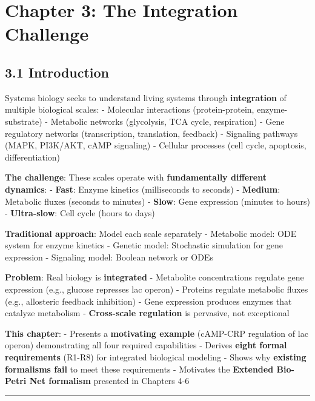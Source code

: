 \hypertarget{chapter-3-the-integration-challenge}{%
\chapter{Chapter 3: The Integration
Challenge}\label{chapter-3-the-integration-challenge}}

\hypertarget{introduction}{%
\section{3.1 Introduction}\label{introduction}}

Systems biology seeks to understand living systems through
\textbf{integration} of multiple biological scales: - Molecular
interactions (protein-protein, enzyme-substrate) - Metabolic networks
(glycolysis, TCA cycle, respiration) - Gene regulatory networks
(transcription, translation, feedback) - Signaling pathways (MAPK,
PI3K/AKT, cAMP signaling) - Cellular processes (cell cycle, apoptosis,
differentiation)

\textbf{The challenge}: These scales operate with \textbf{fundamentally
different dynamics}: - \textbf{Fast}: Enzyme kinetics (milliseconds to
seconds) - \textbf{Medium}: Metabolic fluxes (seconds to minutes) -
\textbf{Slow}: Gene expression (minutes to hours) - \textbf{Ultra-slow}:
Cell cycle (hours to days)

\textbf{Traditional approach}: Model each scale separately - Metabolic
model: ODE system for enzyme kinetics - Genetic model: Stochastic
simulation for gene expression - Signaling model: Boolean network or
ODEs

\textbf{Problem}: Real biology is \textbf{integrated} - Metabolite
concentrations regulate gene expression (e.g., glucose represses lac
operon) - Proteins regulate metabolic fluxes (e.g., allosteric feedback
inhibition) - Gene expression produces enzymes that catalyze metabolism
- \textbf{Cross-scale regulation} is pervasive, not exceptional

\textbf{This chapter}: - Presents a \textbf{motivating example}
(cAMP-CRP regulation of lac operon) demonstrating all four required
capabilities - Derives \textbf{eight formal requirements} (R1-R8) for
integrated biological modeling - Shows why \textbf{existing formalisms
fail} to meet these requirements - Motivates the \textbf{Extended
Bio-Petri Net formalism} presented in Chapters 4-6

\begin{center}\rule{0.5\linewidth}{0.5pt}\end{center}

